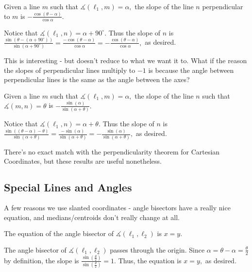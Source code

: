\documentclass[mast]{lucky}
\begin{document}
\begin{theo}
Given a line $m$ such that $\measuredangle(\ell_1,m)=\alpha,$ the slope of the line $n$ perpendicular to $m$ is $-\frac{\cos(\theta-\alpha)}{\cos\alpha}.$
\end{theo}

\begin{pro}
Notice that $\measuredangle(\ell_1,n)=\alpha+90^{\circ}.$ Thus the slope of $n$ is $\frac{\sin(\theta-(\alpha+90^{\circ}))}{\sin(\alpha+90^{\circ})}=\frac{-\cos(\theta-\alpha)}{\cos\alpha}=-\frac{\cos(\theta-\alpha)}{\cos\alpha},$ as desired.
\end{pro}

This is interesting - but doesn't reduce to what we want it to. What if the reason the slopes of perpendicular lines multiply to $-1$ is because the angle between perpendicular lines is the same as the angle between the axes?

\begin{theo}
Given a line $m$ such that $\measuredangle(\ell_1,m)=\alpha,$ the slope of the line $n$ such that $\measuredangle(m,n)=\theta$ is $-\frac{\sin(\alpha)}{\sin(\alpha+\theta)}.$
\end{theo}

\begin{pro}
Notice that $\measuredangle(\ell_1,n)=\alpha+\theta.$ Thus the slope of $n$ is $\frac{\sin((\theta-\alpha)-\theta)}{\sin(\alpha+\theta)}=\frac{-\sin(\alpha)}{\sin(\alpha+\theta)}=-\frac{\sin(\alpha)}{\sin(\alpha+\theta)},$ as desired.
\end{pro}

There's no exact match with the perpendicularity theorem for Cartesian Coordinates, but these results are useful nonetheless.

\subsection{Special Lines and Angles}

A few reasons we use slanted coordinates - angle bisectors have a really nice equation, and medians/centroids don't really change at all.

\begin{theo}
The equation of the angle bisector of $\measuredangle(\ell_1,\ell_2)$ is $x=y.$
\end{theo}

\begin{pro}
The angle bisector of $\measuredangle(\ell_1,\ell_2)$ passes through the origin. Since $\alpha=\theta-\alpha=\frac{\theta}{2}$ by definition, the slope is $\frac{\sin(\frac{\theta}{2})}{\sin(\frac{\theta}{2})}=1.$ Thus, the equation is $x=y,$ as desired.
\end{pro}
\end{document}
